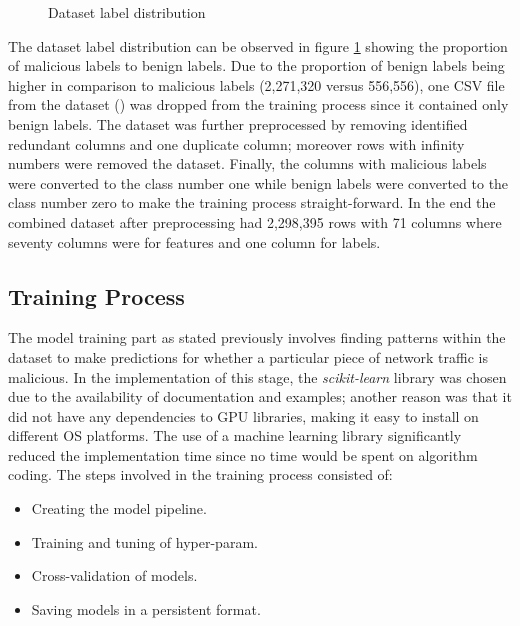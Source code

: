 \begin{figure}[ht]
    \centering
    \caption{Dataset label distribution}
    \label{fig:dataset-label-dist}
\end{figure}

\clearpage
The dataset label distribution can be observed in figure \ref{fig:dataset-label-dist} showing the proportion of malicious labels to benign labels.
Due to the proportion of benign labels being higher in comparison to malicious labels (2,271,320 versus 556,556), one CSV file from the dataset (\texttt{}) was dropped from the training process since it contained only benign labels.
The dataset was further preprocessed by removing identified redundant columns and one duplicate column;
moreover rows with infinity numbers were removed the dataset.
Finally, the columns with malicious labels were converted to the class number one while
benign labels were converted to the class number zero to make the training process straight-forward.
In the end the combined dataset after preprocessing had 2,298,395 rows with 71 columns where seventy columns were for features and one column for labels.


\subsection{Training Process}
The model training part as stated previously involves finding patterns within the dataset to make predictions for whether a particular piece of network traffic is malicious.
In the implementation of this stage, the \emph{scikit-learn} \cite{scikit-learn} library was chosen due to the availability of documentation and examples;
another reason was that it did not have any dependencies to GPU libraries, making it easy to install on different OS platforms.
The use of a machine learning library significantly reduced the implementation time since no time would be spent on algorithm coding.
The steps involved in the training process consisted of:

\begin{itemize}
    \item Creating the model pipeline.
    \item Training and tuning of \gls{hyper-param}.
    \item Cross-validation of models.
    \item Saving models in a persistent format.
\end{itemize}


